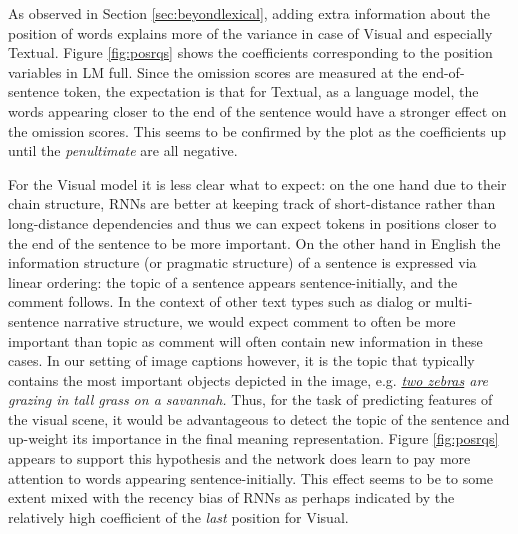 As observed in Section \ref{sec:beyondlexical}, 
adding extra information about the position of words 
explains more of the variance in case of {\sc Visual} and especially {\sc Textual}.
Figure \ref{fig:posrqs} shows the coefficients corresponding to the
position variables in {\sc LM full}. Since the omission scores 
are measured at the end-of-sentence token, the expectation is that 
for {\sc Textual}, as a language model,  
the words appearing closer to the end of the sentence would have a
stronger effect on the omission scores. This seems to be confirmed by
the plot as the coefficients up until the \emph{penultimate} are all negative.


For the {\sc Visual} model it is less clear what to
expect: on the one hand due to their chain structure,  
RNNs are better at keeping track of
short-distance rather than long-distance dependencies and thus we can expect 
tokens in positions closer to the end of the sentence to be more important. 
On the other hand in English the information structure (or pragmatic structure) 
of a sentence is expressed via linear ordering: the {\sc topic} of a 
sentence appears sentence-initially, and the {\sc comment} follows. 
In the context of other text types such as dialog or multi-sentence \label{edit:topiccomment}
narrative structure, we would expect {\sc comment} to often be more
important than {\sc topic} as {\sc comment} will often 
contain new information in these cases. In our setting of image captions 
however, it is the {\sc topic} that typically contains the most important 
objects depicted in the image, e.g. {\it {\underline{two zebras}} are grazing in tall grass on a savannah.}
Thus, for the task of predicting features of the visual scene, it would 
be advantageous to detect the topic of the sentence and up-weight its
importance in the final meaning representation. Figure \ref{fig:posrqs}
appears to support this hypothesis and the network does 
learn to pay more attention to  words appearing
sentence-initially. This effect seems to be to some extent mixed with the recency
bias of RNNs as perhaps indicated by the relatively high coefficient of the {\it last}
position for {\sc Visual}. 




